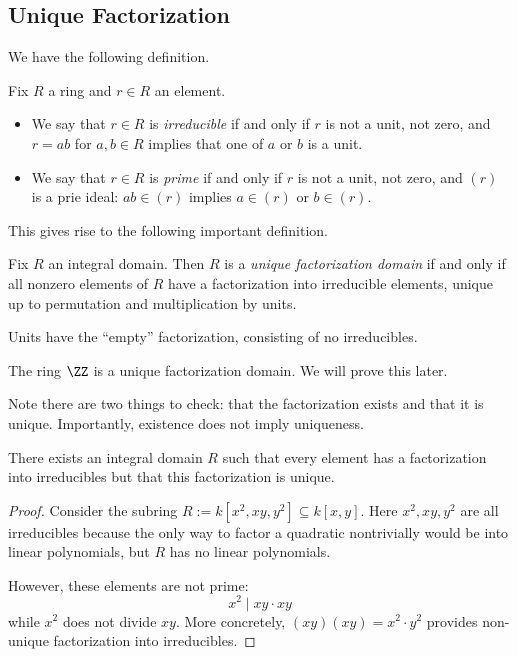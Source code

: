 \subsection{Unique Factorization}
We have the following definition.
\begin{definition}
	Fix $R$ a ring and $r\in R$ an element.
	\begin{itemize}
		\item We say that $r\in R$ is \textit{irreducible} if and only if $r$ is not a unit, not zero, and $r=ab$ for $a,b\in R$ implies that one of $a$ or $b$ is a unit.
		\item We say that $r\in R$ is \textit{prime} if and only if $r$ is not a unit, not zero, and $(r)$ is a prie ideal: $ab\in(r)$ implies $a\in(r)$ or $b\in(r)$.
	\end{itemize}
\end{definition}
This gives rise to the following important definition.
\begin{definition}
	Fix $R$ an integral domain. Then $R$ is a \textit{unique factorization domain} if and only if all nonzero elements of $R$ have a factorization into irreducible elements, unique up to permutation and multiplication by units.
\end{definition}
\begin{remark}
	Units have the ``empty'' factorization, consisting of no irreducibles.
\end{remark}
\begin{example}
	The ring $\ZZ$ is a unique factorization domain. We will prove this later.
\end{example}
Note there are two things to check: that the factorization exists and that it is unique. Importantly, existence does not imply uniqueness.
\begin{exe}
	There exists an integral domain $R$ such that every element has a factorization into irreducibles but that this factorization is unique.
\end{exe}
\begin{proof}
	Consider the subring $R:=k\left[x^2,xy,y^2\right]\subseteq k[x,y]$. Here $x^2,xy,y^2$ are all irreducibles because the only way to factor a quadratic nontrivially would be into linear polynomials, but $R$ has no linear polynomials.
	
	However, these elements are not prime:
	\[x^2\mid xy\cdot xy\]
	while $x^2$ does not divide $xy$. More concretely, $(xy)(xy)=x^2\cdot y^2$ provides non-unique factorization into irreducibles.
\end{proof}
